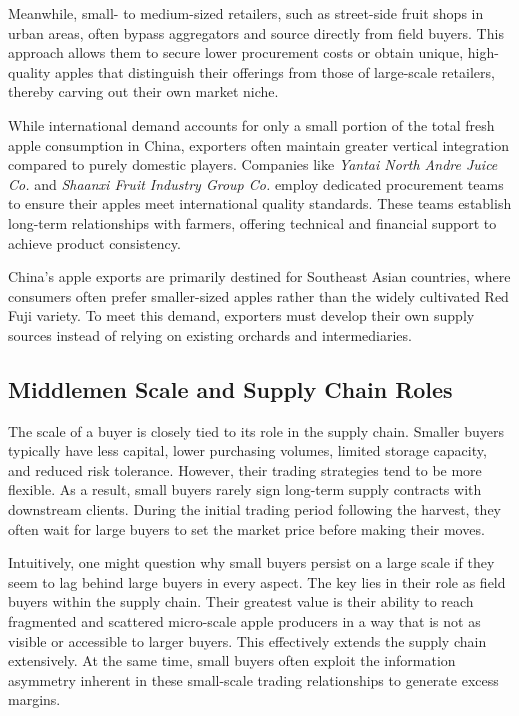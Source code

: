 Meanwhile, small- to medium-sized retailers, such as street-side fruit shops in urban areas, often bypass aggregators and source directly from field buyers. This approach allows them to secure lower procurement costs or obtain unique, high-quality apples that distinguish their offerings from those of large-scale retailers, thereby carving out their own market niche.

While international demand accounts for only a small portion of the total fresh apple consumption in China, exporters often maintain greater vertical integration compared to purely domestic players. Companies like \textit{Yantai North Andre Juice Co.} and \textit{Shaanxi Fruit Industry Group Co.} employ dedicated procurement teams to ensure their apples meet international quality standards. These teams establish long-term relationships with farmers, offering technical and financial support to achieve product consistency.

China's apple exports are primarily destined for Southeast Asian countries, where consumers often prefer smaller-sized apples rather than the widely cultivated Red Fuji variety. To meet this demand, exporters must develop their own supply sources instead of relying on existing orchards and intermediaries.




\subsection{Middlemen Scale and Supply Chain Roles}
\noindent The scale of a buyer is closely tied to its role in the supply chain. Smaller buyers typically have less capital, lower purchasing volumes, limited storage capacity, and reduced risk tolerance. However, their trading strategies tend to be more flexible. As a result, small buyers rarely sign long-term supply contracts with downstream clients. During the initial trading period following the harvest, they often wait for large buyers to set the market price before making their moves.

Intuitively, one might question why small buyers persist on a large scale if they seem to lag behind large buyers in every aspect. The key lies in their role as field buyers within the supply chain. Their greatest value is their ability to reach fragmented and scattered micro-scale apple producers in a way that is not as visible or accessible to larger buyers. This effectively extends the supply chain extensively. At the same time, small buyers often exploit the information asymmetry inherent in these small-scale trading relationships to generate excess margins.

